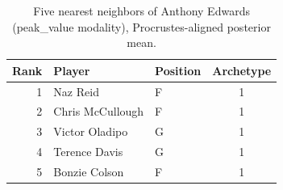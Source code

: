 \begin{table}[htbp]
  \centering\small
  \begin{tabular}{rllc}
    \toprule
    Rank & Player & Position & Archetype \\
    \midrule
    1 & Naz Reid & F & 1 \\
    2 & Chris McCullough & F & 1 \\
    3 & Victor Oladipo & G & 1 \\
    4 & Terence Davis & G & 1 \\
    5 & Bonzie Colson & F & 1 \\
    \bottomrule
  \end{tabular}
  \caption{Five nearest neighbors of Anthony Edwards (peak_value modality), Procrustes-aligned posterior mean.}
  \label{tab:Anthony_Edwards_neighbors_peak_value}
\end{table}

